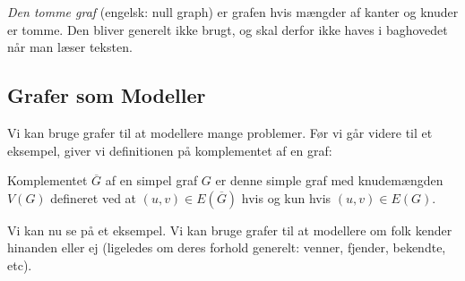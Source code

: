 \begin{remark}
\textit{Den tomme graf} (engelsk: null graph) er grafen hvis mængder af kanter og knuder er tomme. Den bliver generelt ikke brugt, og skal derfor ikke haves i baghovedet når man læser teksten.
\end{remark}

\subsection{Grafer som Modeller}%
\label{subsec:grafersommodeller}

Vi kan bruge grafer til at modellere mange problemer. Før vi går videre til et eksempel, giver vi definitionen på komplementet af en graf:
\begin{definition}
Komplementet $\overline{G}$ af en simpel graf $G$ er denne simple graf med knudemængden $V(G)$ defineret ved at $(u,v) \in E(\overline{G})$ hvis og kun hvis $(u,v) \in E(G)$.
\end{definition}

Vi kan nu se på et eksempel. Vi kan bruge grafer til at modellere om folk kender hinanden eller ej (ligeledes om deres forhold generelt: venner, fjender, bekendte, etc).


